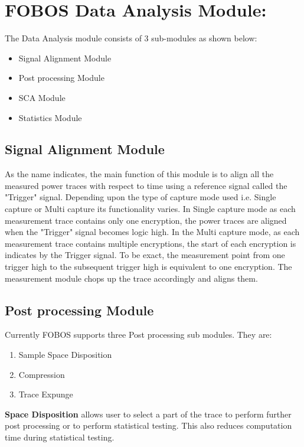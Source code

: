 \documentclass{llncs}
\numberwithin{algorithm}{chapter}
\begin{document}
\section{FOBOS Data Analysis Module:}
The Data Analysis module consists of 3 sub-modules as shown below:
\begin{itemize}
\item Signal Alignment Module
\item Post processing Module
\item SCA Module
\item Statistics Module
\end{itemize}

\subsection{Signal Alignment Module}
As the name indicates, the main function of this module is to align all the measured power traces
with respect to time using a reference signal called the "Trigger" signal. Depending upon the type
of capture mode used i.e. Single capture or Multi capture its functionality varies. In Single capture
mode as each measurement trace contains only one encryption, the power traces are aligned when the 
"Trigger" signal becomes logic high. In the Multi capture mode, as each measurement trace contains 
multiple encryptions, the start of each encryption is indicates by the Trigger signal.
To be exact, the measurement point from one trigger high to the subsequent trigger high is equivalent
to one encryption. The measurement module chops up the trace accordingly and aligns them.

\subsection{Post processing Module}
Currently FOBOS supports three Post processing sub modules. They are:
\begin{enumerate}
\item Sample Space Disposition
\item Compression
\item Trace Expunge
\end{enumerate}

\textbf{Space Disposition} allows user to select a part of the trace to perform further post processing
or to perform statistical testing. This also reduces computation time during statistical testing.
\end{document}
